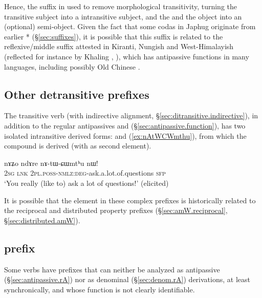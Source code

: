 Hence, the  suffix in  used to remove morphological transitivity, turning the transitive subject into a intransitive subject, and the and the object into an (optional) semi-object. Given the fact that some  codas in Japhug originate from earlier * (§\ref{sec:suffixes}), it is possible that this  suffix is related to the reflexive/middle suffix attested in Kiranti, Nungish and West-Himalayish (reflected for instance by Khaling , \citealt{jacques16si}), which has antipassive functions in many languages, including possibly Old Chinese \citep{jacques20antipass}.
 
 \subsection{Other detransitive prefixes} \label{sec:CWmthu}
 The transitive verb  (with indirective alignment, §\ref{sec:ditransitive.indirective}), in addition to the regular antipassives  and  (§\ref{sec:antipassive.function}), has two isolated intransitive derived forms:  and   (\ref{ex:nAtWCWmthu}), from which the compound  is derived (with  as second element).
 
  \begin{exe}
\ex \label{ex:nAtWCWmthu}
\gll nɤʑo ndɤre nɤ-tɯ-ɕɯmtʰu nɯ! \\
\textsc{2sg} \textsc{lnk} \textsc{2pl}.\textsc{poss}-\textsc{nmlz}:\textsc{deg}-ask.a.lot.of.questions \textsc{sfp} \\
\glt `You really (like to) ask a lot of questions!' (elicited)
\end{exe}

It is possible that the  element in these complex prefixes is historically related to the  reciprocal and distributed property prefixes (§\ref{sec:amW.reciprocal}, §\ref{sec:distributed.amW}).


\subsection{ prefix} \label{sec:rA.non.apass}
Some verbs have  prefixes that can neither be analyzed as antipassive (§\ref{sec:antipassive.rA}) nor as denominal (§\ref{sec:denom.rA}) derivations, at least synchronically, and whose function is not clearly identifiable.

